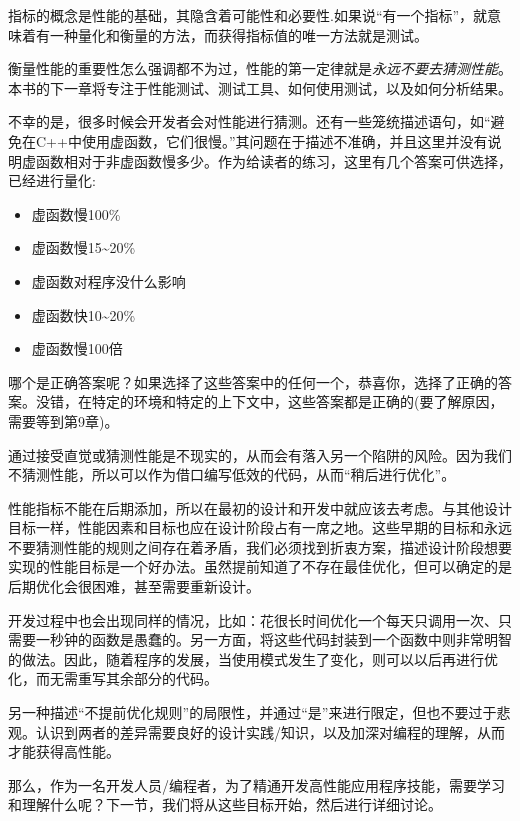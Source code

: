 指标的概念是性能的基础，其隐含着可能性和必要性.如果说“有一个指标”，就意味着有一种量化和衡量的方法，而获得指标值的唯一方法就是测试。

衡量性能的重要性怎么强调都不为过，性能的第一定律就是\textit{永远不要去猜测性能}。本书的下一章将专注于性能测试、测试工具、如何使用测试，以及如何分析结果。

不幸的是，很多时候会开发者会对性能进行猜测。还有一些笼统描述语句，如“避免在C++中使用虚函数，它们很慢。”其问题在于描述不准确，并且这里并没有说明虚函数相对于非虚函数慢多少。作为给读者的练习，这里有几个答案可供选择，已经进行量化:

\begin{itemize}
\item 虚函数慢100\%
\item 虚函数慢15\textasciitilde20\%
\item 虚函数对程序没什么影响
\item 虚函数快10\textasciitilde20\%
\item 虚函数慢100倍
\end{itemize}

哪个是正确答案呢？如果选择了这些答案中的任何一个，恭喜你，选择了正确的答案。没错，在特定的环境和特定的上下文中，这些答案都是正确的(要了解原因，需要等到第9章)。

通过接受直觉或猜测性能是不现实的，从而会有落入另一个陷阱的风险。因为我们不猜测性能，所以可以作为借口编写低效的代码，从而“稍后进行优化”。

性能指标不能在后期添加，所以在最初的设计和开发中就应该去考虑。与其他设计目标一样，性能因素和目标也应在设计阶段占有一席之地。这些早期的目标和永远不要猜测性能的规则之间存在着矛盾，我们必须找到折衷方案，描述设计阶段想要实现的性能目标是一个好办法。虽然提前知道了不存在最佳优化，但可以确定的是后期优化会很困难，甚至需要重新设计。

开发过程中也会出现同样的情况，比如：花很长时间优化一个每天只调用一次、只需要一秒钟的函数是愚蠢的。另一方面，将这些代码封装到一个函数中则非常明智的做法。因此，随着程序的发展，当使用模式发生了变化，则可以以后再进行优化，而无需重写其余部分的代码。

另一种描述“不提前优化规则”的局限性，并通过“是”来进行限定，但也不要过于悲观。认识到两者的差异需要良好的设计实践/知识，以及加深对编程的理解，从而才能获得高性能。

那么，作为一名开发人员/编程者，为了精通开发高性能应用程序技能，需要学习和理解什么呢？下一节，我们将从这些目标开始，然后进行详细讨论。
















